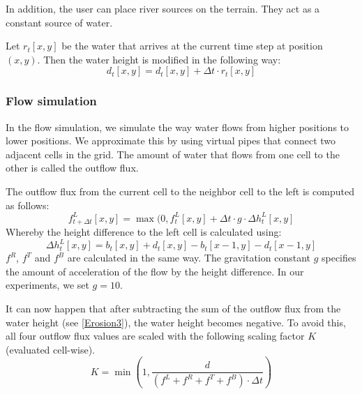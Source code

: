 \documentclass[journal, letterpaper]{IEEEtran}
\begin{document}
In addition, the user can place river sources on the terrain. They act as a constant source of water.

Let $r_t[x,y]$ be the water that arrives at the current time step at position $(x,y)$. Then the water height is modified in the following way:
\begin{equation}
	d_t[x,y] = d_t[x,y] + \Delta t \cdot r_t[x,y]
\label{eq:ErosionRain}
\end{equation}

\subsubsection{Flow simulation}
In the flow simulation, we simulate the way water flows from higher positions to lower positions. We approximate this by using virtual pipes that connect two adjacent cells in the grid. The amount of water that flows from one cell to the other is called the outflow flux.

The outflow flux from the current cell to the neighbor cell to the left is computed as follows:
\begin{equation}
	f_{t+\Delta t}^L[x,y] = \max(0, f_t^L[x,y]+\Delta t \cdot g \cdot \Delta h_t^L[x,y]
\label{eq:ErosionFlow1}
\end{equation}
Whereby the height difference to the left cell is calculated using:
\begin{equation}
	\Delta h_t^L[x,y] = b_t[x,y]+d_t[x,y]-b_t[x-1,y]-d_t[x-1,y]
\label{eq:ErosionFlow2}
\end{equation}
$f^R$, $f^T$ and $f^B$ are calculated in the same way.
The gravitation constant $g$ specifies the amount of acceleration of the flow by the height difference. In our experiments, we set $g=10$.

It can now happen that after subtracting the sum of the outflow flux from the water height (see \ref{Erosion3}), the water height becomes negative.
To avoid this, all four outflow flux values are scaled with the following scaling factor $K$ (evaluated cell-wise).
\begin{equation}
	K=\min(1, \frac{d}{(f^L+f^R+f^T+f^B)\cdot \Delta t})
\label{eq:ErosionFlow3}
\end{equation}
\end{document}
